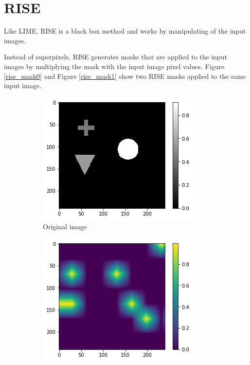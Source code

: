 \section{RISE}

Like LIME, RISE\cite{Petsiuk2018rise} is a black box method and works by manipulating of the input images.

Instead of superpixels, RISE generates masks that are applied to the input images by multiplying the mask with the input image pixel values. Figure \ref{rise_mask0} and Figure \ref{rise_mask1} show two RISE masks applied to the same input image.

\begin{figure}[H]
    \centering
    \begin{subfigure}[t]{.32\textwidth}
        \centering
        \includegraphics[width=\linewidth]{chapters/02_methods/images/rise/rise_original.png}
        \caption{Original image}
    \end{subfigure}\hfill%
    \begin{subfigure}[t]{.32\textwidth}
        \centering
        \includegraphics[width=\linewidth]{chapters/02_methods/images/rise/rise0_mask.png}

\end{subfigure}
\end{figure}
